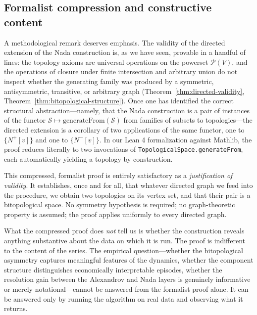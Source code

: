 \documentclass[11pt,a4paper]{article}
\theoremstyle{plain}
\theoremstyle{definition}
\newcommand{\Nfwd}[1]{N^{+}[#1]}
\newcommand{\Nbwd}[1]{N^{-}[#1]}
\newcommand{\powerset}{\mathcal{P}}
\begin{document}
\subsection{Formalist compression and constructive content}%
\label{subsec:formalism-constructivism}

A methodological remark deserves emphasis. The validity of the directed
extension of the Nada construction is, as we have seen, provable in a
handful of lines: the topology axioms are universal operations on the
powerset $\powerset(V)$, and the operations of closure under finite
intersection and arbitrary union do not inspect whether the generating
family was produced by a symmetric, antisymmetric, transitive, or
arbitrary graph
(Theorem~\ref{thm:directed-validity},
Theorem~\ref{thm:bitopological-structure}). Once one has identified the
correct structural abstraction---namely, that the Nada construction is
a pair of instances of the functor $\mathcal{S} \mapsto
\mathrm{generateFrom}(\mathcal{S})$ from families of subsets to
topologies---the directed extension is a corollary of two applications
of the same functor, one to $\{\Nfwd{v}\}$ and one to $\{\Nbwd{v}\}$.
In our Lean 4 formalization against Mathlib, the proof reduces
literally to two invocations of
\texttt{TopologicalSpace.generateFrom}, each automatically yielding a
topology by construction.

This compressed, formalist proof is entirely satisfactory as a
\emph{justification of validity}. It establishes, once and for all,
that whatever directed graph we feed into the procedure, we obtain two
topologies on its vertex set, and that their pair is a bitopological
space. No symmetry hypothesis is required; no graph-theoretic property
is assumed; the proof applies uniformly to every directed graph.

What the compressed proof does \emph{not} tell us is whether the
construction reveals anything substantive about the data on which it is
run. The proof is indifferent to the content of the series. The
empirical question---whether the bitopological asymmetry captures
meaningful features of the dynamics, whether the component structure
distinguishes economically interpretable episodes, whether the
resolution gain between the Alexandrov and Nada layers is genuinely
informative or merely notational---cannot be answered from the
formalist proof alone. It can be answered only by running the algorithm
on real data and observing what it returns.
\end{document}
